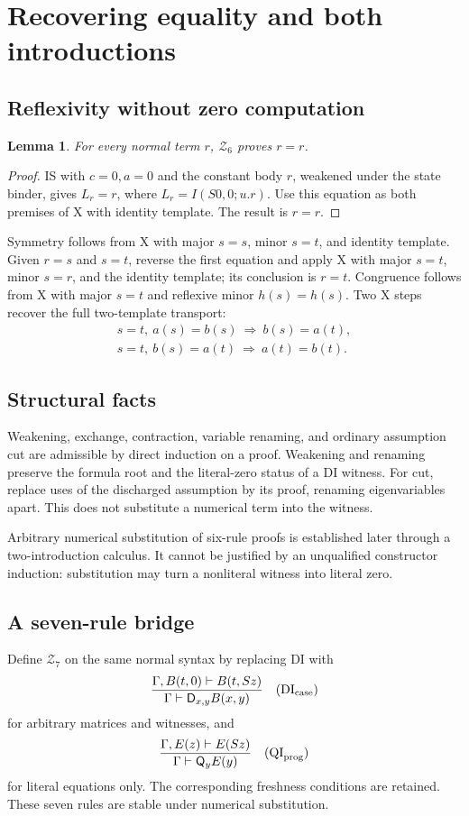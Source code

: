 \documentclass[11pt]{article}
\newtheorem{lemma}[theorem]{Lemma}
\newcommand{\Zsix}{\mathcal Z_6}
\newcommand{\Zseven}{\mathcal Z_7}
\newcommand{\Q}{\mathsf Q}\newcommand{\D}{\mathsf D}
\begin{document}
\section{Recovering equality and both introductions}\label{sec:derived}
\subsection{Reflexivity without zero computation}
\begin{lemma}\label{lem:rfl}
For every normal term \(r\), \(\Zsix\) proves \(r=r\).
\end{lemma}
\begin{proof}
IS with \(c=0,a=0\) and the constant body \(r\), weakened under the
state binder, gives \(L_r=r\), where \(L_r=I(S0,0;u.r)\).
Use this equation as both premises of X with identity template.
The result is \(r=r\).
\end{proof}

Symmetry follows from X with major \(s=s\), minor \(s=t\), and identity
template. Given \(r=s\) and \(s=t\), reverse the first equation and apply X
with major \(s=t\), minor \(s=r\), and the identity template; its
conclusion is \(r=t\). Congruence follows from X with major \(s=t\)
and reflexive minor \(h(s)=h(s)\).
Two X steps recover the full two-template transport:
\[
 \begin{gathered}
 s=t,\ a(s)=b(s)\ \Longrightarrow\ b(s)=a(t),\\
 s=t,\ b(s)=a(t)\ \Longrightarrow\ a(t)=b(t).
 \end{gathered}                                         \tag{Tr}
\]

\subsection{Structural facts}
Weakening, exchange, contraction, variable renaming, and ordinary
assumption cut are admissible by direct induction on a proof.
Weakening and renaming preserve the formula root and the literal-zero
status of a DI witness. For cut, replace uses of the discharged
assumption by its proof, renaming eigenvariables apart. This does not
substitute a numerical term into the witness.

Arbitrary numerical substitution of six-rule proofs is established
later through a two-introduction calculus. It cannot be justified by
an unqualified constructor induction: substitution may turn a
nonliteral witness into literal zero.

\subsection{A seven-rule bridge}
Define \(\Zseven\) on the same normal syntax by replacing DI with
\[
 \frac{\Gamma,B(t,0)\vdash B(t,Sz)}
      {\Gamma\vdash\D_{x,y}B(x,y)}
 \quad(\mathrm{DI}_{\rm case})
\]
for arbitrary matrices and witnesses, and
\[
 \frac{\Gamma,E(z)\vdash E(Sz)}
      {\Gamma\vdash\Q_y E(y)}
 \quad(\mathrm{QI}_{\rm prog})
\]
for literal equations only. The corresponding freshness conditions
are retained. These seven rules are stable under numerical substitution.
\end{document}
